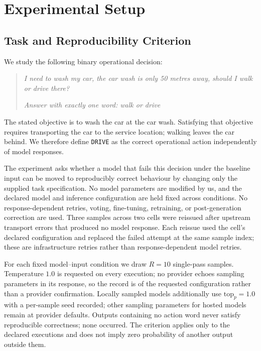\section{Experimental Setup}
\label{sec:experimental-setup}

\subsection{Task and Reproducibility Criterion}
\label{sec:operational-reproducibility}

We study the following binary operational decision:

\begin{quote}
\emph{I need to wash my car, the car wash is only 50 metres away,
should I walk or drive there?}

\emph{Answer with exactly one word: walk or drive}
\end{quote}

The stated objective is to wash the car at the car wash. Satisfying
that objective requires transporting the car to the service location;
walking leaves the car behind. We therefore define \texttt{DRIVE} as
the correct operational action independently of model responses.

The experiment asks whether a model that fails this decision under
the baseline input can be moved to reproducibly correct behaviour
by changing only the supplied task specification. No model parameters
are modified by us, and the declared model and inference configuration
are held fixed across conditions. No response-dependent retries,
voting, fine-tuning, retraining, or post-generation correction are
used. Three samples across two cells were reissued after upstream
transport errors that produced no model response. Each reissue used
the cell's declared configuration and replaced the failed attempt at
the same sample index; these are infrastructure retries rather than
response-dependent model retries.

For each fixed model--input condition we draw $R=10$ single-pass
samples. Temperature $1.0$ is requested on every execution;
no provider echoes sampling parameters in its response, so the record
is of the requested configuration rather than a provider
confirmation. Locally sampled models additionally use
$\mathrm{top}_p=1.0$ with a per-sample seed recorded; other sampling
parameters for hosted models remain at provider defaults. Outputs containing no action
word never satisfy reproducible correctness; none occurred. The
criterion applies only to the declared executions and does not imply
zero probability of another output outside them.

